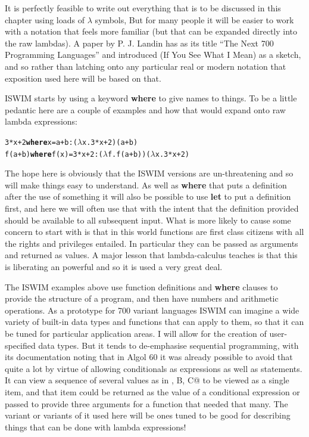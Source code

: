 It is perfectly feasible to write out everything that is to be discussed in
this chapter using loads of $\lambda$ symbols, But for many people it
will be easier to work with a notation that feels more familiar (but that
can be expanded directly into the raw lambdas). A paper by P. J.
Landin\cite{next700} has as its title ``The Next 700 Programming Languages''
and introduced \verb@ISWIM@ (If You See What I Mean) as a sketch, and
so rather than latching onto any particular real or modern notation that
exposition used here will be based on that.
   
ISWIM starts by using a keyword \textbf{where} to give names to things.
To be a little pedantic here are a couple of examples and how
that would expand onto raw lambda expressions:
\begin{alltt}
 3*x+2 {\bf where} x = a + b       : (\(\lambda\) x . 3*x+2) (a + b)
 f(a+b) {\bf where} f(x) = 3*x + 2 : (\(\lambda\) f . f(a + b)) (\(\lambda\) x . 3*x+2)
\end{alltt}

The hope here is obviously that the ISWIM versions are un-threatening
and so will make things easy to understand. As well as \textbf{where}
that puts a definition after the use of something it will also be
possible to use \textbf{let} to put a definition first, and here we will
often use that with the intent that the definition provided should be
available to all subsequent input. What is more likely to cause some
concern to start with is that in this world functions are first class
citizens with all the rights and privileges entailed. In particular they
can be passed as arguments and returned as values. A major lesson that
lambda-calculus teaches is that this is liberating an powerful and
so it is used a very great deal.

The ISWIM examples above use function definitions and \textbf{where}
clauses to provide the structure of a program, and then have numbers
and arithmetic operations. As a prototype for 700 variant languages ISWIM
can imagine a wide variety of built-in data types and functions that
can apply to them, so that it can be tuned for particular application areas.
I will allow for the creation of user-specified data types. But it tends
to de-emphasise sequential programming, with its documentation noting that
in Algol 60 it was already possible to avoid that quite a lot by virtue
of allowing conditionals as expressions as well as statements. It can view
a sequence of several values as in \verb@A, B, C@ to be viewed as a single
item, and that item could be returned as the value of a conditional
expression or passed to provide three arguments for a function that needed
that many. The variant or variants of it used here will be ones tuned to be
good for describing things that can be done with lambda expressions!

